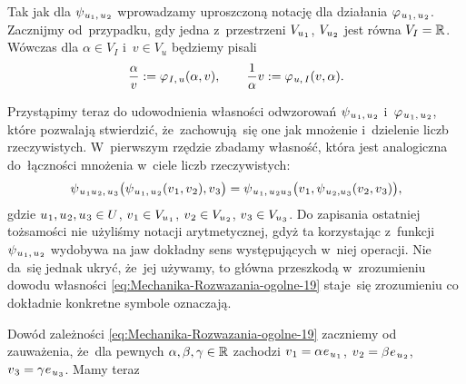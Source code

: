 \documentclass[a4paper,11pt]{article}
\numberwithin{equation}{section}
\begin{document}
Tak jak dla $\psi_{ \hspace{0.05em} u_{ 1 }, \, u_{ \hspace{0.05em} 2 } }$ wprowadzamy
uproszczoną notację dla działania
$\varphi_{ \hspace{0.07em} u_{ \hspace{0.05em} 1 }, \, u_{ \hspace{0.05em} 2 } }$. Zacznijmy
od~przypadku, gdy jedna z~przestrzeni $V_{ u_{ \hspace{0.05em} 1 } }$,
$V_{ u_{ \hspace{0.05em} 2 } }$ jest równa $V_{ I } = \mathbb{R}$. Wówczas dla
$\alpha \in V_{ I }$ i~$v \in V_{ u }$ będziemy pisali
\begin{equation}
  \label{eq:Mechanika-Rozwazania-ogolne-19}
  \frac{ \alpha }{ v } := \varphi_{ \hspace{0.05em} I, \, u }( \alpha, v ), \qquad
  \frac{ 1 }{ \alpha } v := \varphi_{ \hspace{0.05em} u, \, I }( v, \alpha ).
\end{equation}



Przystąpimy teraz do udowodnienia własności odwzorowań
$\psi_{ \hspace{0.07em} u_{ \hspace{0.05em} 1 }, \, u_{ \hspace{0.05em} 2 } }$
i~$\varphi_{ \hspace{0.07em} u_{ \hspace{0.05em} 1 }, \, u_{ \hspace{0.05em} 2 } }$, które pozwalają
stwierdzić, że~zachowują~się one jak mnożenie i~dzielenie liczb
rzeczywistych. W~pierwszym rzędzie zbadamy własność, która jest analogiczna
do~łączności mnożenia w~ciele liczb rzeczywistych:
\begin{equation}
  \label{eq:Mechanika-Rozwazania-ogolne-20}
  \psi_{ \hspace{0.07em} u_{ \hspace{0.05em} 1 } u_{ \hspace{0.05em} 2 }, \,
    u_{ \hspace{0.05em} 3 } }\big(
  \psi_{ \hspace{0.07em} u_{ \hspace{0.05em} 1 }, \, u_{ \hspace{0.05em} 2 } }(
  v_{ \hspace{0.05em} 1 }, v_{ \hspace{0.05em} 2 } ), v_{ \hspace{0.05em} 3 } \big) =
  \psi_{ \hspace{0.07em} u_{ \hspace{0.05em} 1 }, \, u_{ \hspace{0.05em} 2 }
    u_{ \hspace{0.05em} 3 } }\big( v_{ \hspace{0.05em} 1 },
  \psi_{ \hspace{0.07em} u_{ \hspace{0.05em} 2 }, u_{ \hspace{0.05em} 3 } }(
  v_{ \hspace{0.05em} 2 }, v_{ \hspace{0.05em} 3 } ) \big),
\end{equation}
gdzie
$u_{ \hspace{0.05em} 1 }, u_{ \hspace{0.05em} 2 }, u_{ \hspace{0.05em} 3 } \in U$,
$v_{ \hspace{0.05em} 1 } \in V_{ u_{ \hspace{0.05em} 1 } }$,
$v_{ \hspace{0.05em} 2 } \in V_{ u_{ \hspace{0.05em} 2 } }$,
$v_{ \hspace{0.05em} 3 } \in V_{ u_{ \hspace{0.05em} 3 } }$. Do zapisania ostatniej
tożsamości nie użyliśmy notacji arytmetycznej, gdyż ta korzystając
z~funkcji $\psi_{ \hspace{0.07em} u_{ \hspace{0.05em} 1 }, \, u_{ \hspace{0.05em} 2 } }$ wydobywa
na jaw dokładny sens występujących w~niej operacji. Nie da~się jednak ukryć,
że~jej używamy, to główna przeszkodą w~zrozumieniu dowodu własności
\eqref{eq:Mechanika-Rozwazania-ogolne-19} staje~się zrozumieniu co dokładnie
konkretne symbole oznaczają.

Dowód zależności \eqref{eq:Mechanika-Rozwazania-ogolne-19} zaczniemy od
zauważenia, że~dla pewnych $\alpha, \beta, \gamma \in \mathbb{R}$ zachodzi
$v_{ \hspace{0.05em} 1 } =
\alpha \hspace{0.05em} e_{ \hspace{0.07em} u_{ \hspace{0.05em} 1 } }$,
$v_{ \hspace{0.05em} 2 } =
\beta \hspace{0.05em} e_{ \hspace{0.07em} u_{ \hspace{0.05em} 2 } }$,
$v_{ \hspace{0.05em} 3 } =
\gamma \hspace{0.05em} e_{ \hspace{0.07em} u_{ \hspace{0.05em} 3 } }$. Mamy teraz
\end{document}
